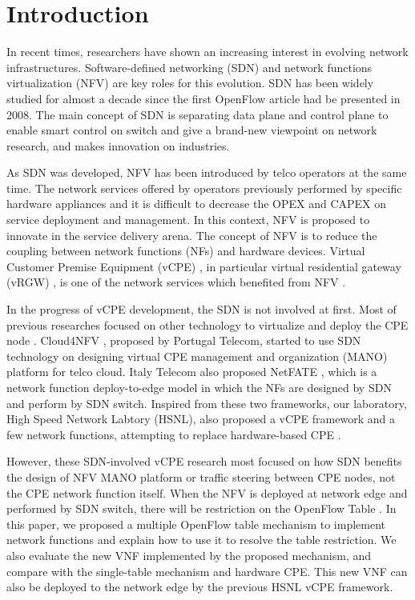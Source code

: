 \chapter{Introduction}
In recent times, researchers have shown an increasing interest in evolving network infrastructures. Software-defined networking (SDN) and network functions virtualization (NFV) are key roles for this evolution. SDN \cite{sdn-mckeown-2009-talk, sdn-newnorm, sdn-road, sdn-compre-survey} has been widely studied for almost a decade since the first OpenFlow \cite{openflow-mckeown-2008, openflow-spec} article had be presented in 2008. The main concept of SDN is separating data plane and control plane to enable smart control on switch and give a brand-new viewpoint on network research, and makes innovation on industries.

As SDN was developed, NFV \cite{nfv-wp, etsi-nfv-archi, nfv-survey} has been introduced by telco operators at the same time. The network services offered by operators previously performed by specific hardware appliances and it is difficult to decrease the OPEX and CAPEX on service deployment and management. In this context, NFV is proposed to innovate in the service delivery arena. The concept of NFV is to reduce the coupling between network functions (NFs) and hardware devices. Virtual Customer Premise Equipment (vCPE) \cite{vcpe-enhance}, in particular virtual residential gateway (vRGW) \cite{nfv-home}, is one of the network services which benefited from NFV \cite{etsi-nfv-usecase}.

In the progress of vCPE development, the SDN is not involved at first. Most of previous researches focused on other technology to virtualize and deploy the CPE node \cite{virtual-rg, security-vgw, design-vrgw, nfv-hgw-surrogate, linux-cpe, nfv-resoure-contrain-cpe}.
Cloud4NFV \cite{cloud4nfv, cloud4nfv-telco}, proposed by Portugal Telecom, started to use SDN technology on designing virtual CPE management and organization (MANO) platform for telco cloud. Italy Telecom also proposed NetFATE \cite{netfate}, which is a network function deploy-to-edge model in which the NFs are designed by SDN and perform by SDN switch. Inspired from these two frameworks, our laboratory, High Speed Network Labtory (HSNL), also proposed a vCPE framework and a few network functions, attempting to replace hardware-based CPE \cite{che-wei-master, che-wei-umedia}.

However, these SDN-involved vCPE research most focused on how SDN benefits the design of NFV MANO \cite{etsi-nfv-mano, etsi-nfv-mano-sdn} platform or traffic steering between CPE nodes, not the CPE network function itself. When the NFV is deployed at network edge and performed by SDN switch, there will be restriction on the OpenFlow Table \cite{multiple-flow-table}. In this paper, we proposed a multiple OpenFlow table mechanism to implement network functions and explain how to use it to resolve the table restriction. We also evaluate the new VNF implemented by the proposed mechanism, and compare with the single-table mechanism and hardware CPE. This new VNF can also be deployed to the network edge by the previous HSNL vCPE framework.

